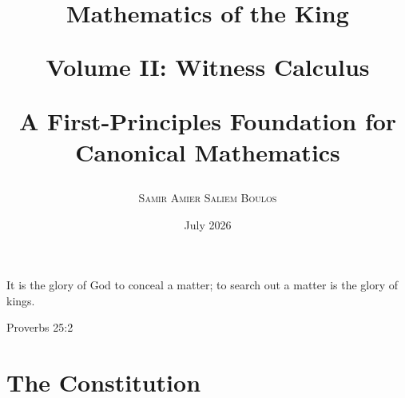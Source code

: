\documentclass[12pt,anyside]{book}
\begin{document}
\newenvironment{completionaudit}
{\section*{Completion Audit}}
{}



%
%




\title{
    {\Huge\bfseries Mathematics of the King} \par
    \vspace{0.75cm}
    {\LARGE Volume II: Witness Calculus} \par
    \vspace{0.5cm}
    {\large A First-Principles Foundation for Canonical Mathematics}
}

\author{\large\textsc{Samir Amier Saliem Boulos}}

\date{July 2026}



\frontmatter


\maketitle


\newpage
\vspace*{\fill}
\begin{center}
    \epigraph{It is the glory of God to conceal a matter; to search out a matter is the glory of kings.}{Proverbs 25:2}
\end{center}
\vspace*{\fill}
\newpage

\chapter{The Constitution}
\end{document}
